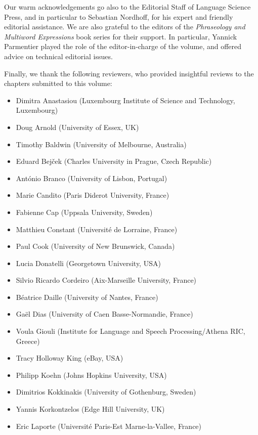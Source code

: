 \documentclass[output=paper,modfonts,]{langscibook}
\begin{document}
Our warm acknowledgements go also to the Editorial Staff of Language Science Press, and in particular to Sebastian Nordhoff, for his expert and friendly  editorial assistance. We are also grateful to the editors of the \emph{Phraseology and Multiword Expressions} book series for their support. In particular, Yannick Parmentier played the role of the editor-in-charge of the volume, and offered advice on technical editorial issues.

Finally, we thank the following reviewers, who provided insightful reviews to the chapters submitted to this volume:

\begin{itemize}
\item Dimitra Anastasiou (Luxembourg Institute of Science and Technology,\\ Luxembourg)
\item Doug Arnold (University of Essex, UK)
\item Timothy Baldwin (University of Melbourne, Australia)
\item Eduard Bejček (Charles University in Prague, Czech Republic)
\item António Branco (University of Lisbon, Portugal)
\item Marie Candito (Paris Diderot University, France)
\item Fabienne Cap (Uppsala University, Sweden)
\item Matthieu Constant (Université de Lorraine, France)
\item Paul Cook (University of New Brunswick, Canada)
\item Lucia Donatelli (Georgetown University, USA)
\item Silvio Ricardo Cordeiro (Aix-Marseille University, France)
\item Béatrice Daille (University of Nantes, France)
\item Gaël Dias (University of Caen Basse-Normandie, France)
\item Voula Giouli (Institute for Language and Speech Processing/Athena RIC, Greece)
\item Tracy Holloway King (eBay, USA)
\item Philipp Koehn (Johns Hopkins University, USA)
\item Dimitrios Kokkinakis (University of Gothenburg, Sweden)
\item Yannis Korkontzelos (Edge Hill University, UK)
\item Eric Laporte (Université Paris-Est Marne-la-Vallee, France)

\end{itemize}
\end{document}
